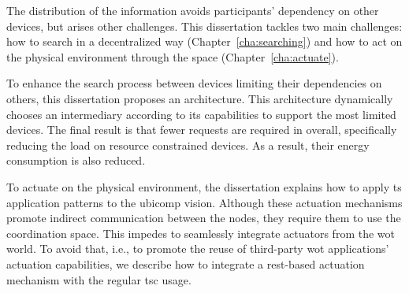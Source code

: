 The distribution of the information avoids participants' dependency on other devices, but arises other challenges.
This dissertation tackles two main challenges: how to search in a decentralized way (Chapter~\ref{cha:searching}) and how to act on the physical environment through the space (Chapter~\ref{cha:actuate}).


To enhance the search process between devices limiting their dependencies on others, this dissertation proposes an architecture.
This architecture dynamically chooses an intermediary according to its capabilities to support the most limited devices.
The final result is that fewer requests are required in overall, specifically reducing the load on resource constrained devices.
As a result, their energy consumption is also reduced.


To actuate on the physical environment, the dissertation explains how to apply \ac{ts} application patterns to the \ac{ubicomp} vision.
Although these actuation mechanisms promote indirect communication between the nodes, they require them to use the coordination space.
This impedes to seamlessly integrate actuators from the \ac{wot} world. %
To avoid that, i.e., to promote the reuse of third-party \ac{wot} applications' actuation capabilities, we describe how to integrate a \ac{rest}-based actuation mechanism with the regular \ac{tsc} usage.








